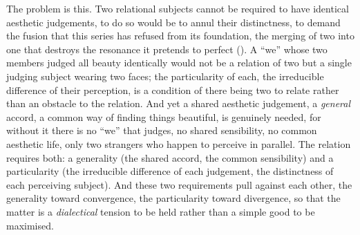 The problem is this. Two relational subjects cannot be required to have identical aesthetic judgements, to do so would be to annul their distinctness, to demand the fusion that this series has refused from its foundation, the merging of two into one that destroys the resonance it pretends to perfect (). A ``we'' whose two members judged all beauty identically would not be a relation of two but a single judging subject wearing two faces; the particularity of each, the irreducible difference of their perception, is a condition of there being two to relate rather than an obstacle to the relation. And yet a shared aesthetic judgement, a \emph{general} accord, a common way of finding things beautiful, is genuinely needed, for without it there is no ``we'' that judges, no shared sensibility, no common aesthetic life, only two strangers who happen to perceive in parallel. The relation requires both: a generality (the shared accord, the common sensibility) and a particularity (the irreducible difference of each judgement, the distinctness of each perceiving subject). And these two requirements pull against each other, the generality toward convergence, the particularity toward divergence, so that the matter is a \emph{dialectical} tension to be held rather than a simple good to be maximised.

